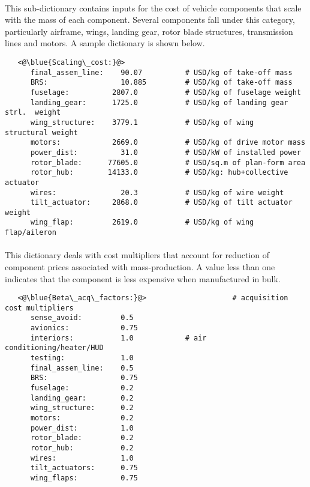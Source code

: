 \paragraph{}
This sub-dictionary contains inputs for the cost of vehicle components that scale with the mass of each component. Several components fall under this category, particularly airframe, wings, landing gear, rotor blade structures, transmission lines and motors. A sample dictionary is shown below.

\begin{lstlisting}
   <@\blue{Scaling\_cost:}@>
      final_assem_line:    90.07          # USD/kg of take-off mass 
      BRS:                 10.885         # USD/kg of take-off mass 
      fuselage:          2807.0           # USD/kg of fuselage weight
      landing_gear:      1725.0           # USD/kg of landing gear strl.  weight
      wing_structure:    3779.1           # USD/kg of wing     structural weight
      motors:            2669.0           # USD/kg of drive motor mass 
      power_dist:          31.0           # USD/kW of installed power
      rotor_blade:      77605.0           # USD/sq.m of plan-form area
      rotor_hub:        14133.0           # USD/kg: hub+collective actuator
      wires:               20.3           # USD/kg of wire weight 
      tilt_actuator:     2868.0           # USD/kg of tilt actuator weight 
      wing_flap:         2619.0           # USD/kg of wing flap/aileron    
\end{lstlisting}

\paragraph{}
This dictionary deals with cost multipliers that account for reduction of component prices associated with mass-production. A value less than one indicates that the component is less expensive when manufactured in bulk.
\begin{lstlisting}
   <@\blue{Beta\_acq\_factors:}@>                    # acquisition cost multipliers 
      sense_avoid:         0.5            
      avionics:            0.75           
      interiors:           1.0            # air conditioning/heater/HUD
      testing:             1.0            
      final_assem_line:    0.5            
      BRS:                 0.75           
      fuselage:            0.2            
      landing_gear:        0.2            
      wing_structure:      0.2            
      motors:              0.2            
      power_dist:          1.0            
      rotor_blade:         0.2            
      rotor_hub:           0.2            
      wires:               1.0            
      tilt_actuators:      0.75           
      wing_flaps:          0.75           
\end{lstlisting}

